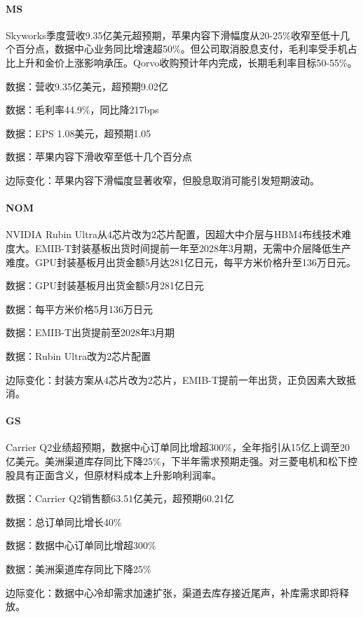 \documentclass[11pt]{ctexart}
\begin{document}
\paragraph{MS} Skyworks季度营收9.35亿美元超预期，苹果内容下滑幅度从20-25\%收窄至低十几个百分点，数据中心业务同比增速超50\%。但公司取消股息支付，毛利率受手机占比上升和金价上涨影响承压。Qorvo收购预计年内完成，长期毛利率目标50-55\%。
{\small\color{refgray}数据：营收9.35亿美元，超预期9.02亿\par}
{\small\color{refgray}数据：毛利率44.9\%，同比降217bps\par}
{\small\color{refgray}数据：EPS 1.08美元，超预期1.05\par}
{\small\color{refgray}数据：苹果内容下滑收窄至低十几个百分点\par}
{\small\color{refgray}边际变化：苹果内容下滑幅度显著收窄，但股息取消可能引发短期波动。\par}
\paragraph{NOM} NVIDIA Rubin Ultra从4芯片改为2芯片配置，因超大中介层与HBM4布线技术难度大。EMIB-T封装基板出货时间提前一年至2028年3月期，无需中介层降低生产难度。GPU封装基板月出货金额5月达281亿日元，每平方米价格升至136万日元。
{\small\color{refgray}数据：GPU封装基板月出货金额5月281亿日元\par}
{\small\color{refgray}数据：每平方米价格5月136万日元\par}
{\small\color{refgray}数据：EMIB-T出货提前至2028年3月期\par}
{\small\color{refgray}数据：Rubin Ultra改为2芯片配置\par}
{\small\color{refgray}边际变化：封装方案从4芯片改为2芯片，EMIB-T提前一年出货，正负因素大致抵消。\par}
\paragraph{GS} Carrier Q2业绩超预期，数据中心订单同比增超300\%，全年指引从15亿上调至20亿美元。美洲渠道库存同比下降25\%，下半年需求预期走强。对三菱电机和松下控股具有正面含义，但原材料成本上升影响利润率。
{\small\color{refgray}数据：Carrier Q2销售额63.51亿美元，超预期60.21亿\par}
{\small\color{refgray}数据：总订单同比增长40\%\par}
{\small\color{refgray}数据：数据中心订单同比增超300\%\par}
{\small\color{refgray}数据：美洲渠道库存同比下降25\%\par}
{\small\color{refgray}边际变化：数据中心冷却需求加速扩张，渠道去库存接近尾声，补库需求即将释放。\par}
\end{document}
